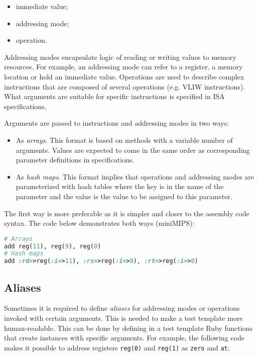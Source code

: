 \documentclass[oneside,final,12pt]{extreport}
\begin{document}
\begin{itemize}
\item immediate value;
\item addressing mode;
\item operation.
\end{itemize}

Addressing modes encapsulate logic of reading or writing values to memory resources.
For example, an addressing mode can refer to a register, a memory location or hold
an immediate value. Operations are used to describe complex instructions that are
composed of several operations (e.g. VLIW instructions). What arguments are suitable
for specific instructions is specified in ISA specifications.

Arguments are passed to instructions and addressing modes in two ways:
\begin{itemize}
\item As \emph{arrays}. This format is based on methods with a variable number of arguments.
      Values are expected to come in the same order as corresponding parameter definitions
      in specifications. 

\item As \emph{hash maps}. This format implies that operations and addressing modes are
      parameterized with hash tables where the key is in the name of the parameter
      and the value is the value to be assigned to this parameter.
\end{itemize}

The first way is more preferable as it is simpler and closer to the assembly code syntax.
The code below demonstrates both ways (miniMIPS):

\begin{lstlisting}[language=ruby]
# Arrays
add reg(11), reg(9), reg(0)
# Hash maps
add :rd=>reg(:i=>11), :rs=>reg(:i=>9), :rt=>reg(:i=>0)
\end{lstlisting}

\subsection{Aliases}

Sometimes it is required to define \emph{aliases} for addressing modes or operations
invoked with certain arguments. This is needed to make a test template more 
human-readable. This can be done by defining in a test template Ruby functions that
create instances with specific arguments. For example, the following code makes it
possible to address registers \texttt{reg(0)} and \texttt{reg(1)} as
\texttt{zero} and \texttt{at}:
\end{document}
